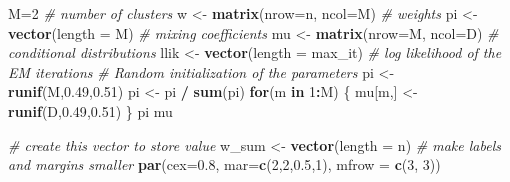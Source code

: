 \documentclass[
]{article}
\newenvironment{Shaded}{\begin{snugshade}}{\end{snugshade}}
\newcommand{\AttributeTok}[1]{\textcolor[rgb]{0.13,0.29,0.53}{#1}}
\newcommand{\CommentTok}[1]{\textcolor[rgb]{0.56,0.35,0.01}{\textit{#1}}}
\newcommand{\ControlFlowTok}[1]{\textcolor[rgb]{0.13,0.29,0.53}{\textbf{#1}}}
\newcommand{\DecValTok}[1]{\textcolor[rgb]{0.00,0.00,0.81}{#1}}
\newcommand{\FloatTok}[1]{\textcolor[rgb]{0.00,0.00,0.81}{#1}}
\newcommand{\FunctionTok}[1]{\textcolor[rgb]{0.13,0.29,0.53}{\textbf{#1}}}
\newcommand{\NormalTok}[1]{#1}
\newcommand{\OtherTok}[1]{\textcolor[rgb]{0.56,0.35,0.01}{#1}}
\newcommand{\SpecialCharTok}[1]{\textcolor[rgb]{0.81,0.36,0.00}{\textbf{#1}}}
\begin{document}
\begin{Shaded}
\begin{Highlighting}[]
\NormalTok{M}\OtherTok{=}\DecValTok{2} \CommentTok{\# number of clusters}
\NormalTok{w }\OtherTok{\textless{}{-}} \FunctionTok{matrix}\NormalTok{(}\AttributeTok{nrow=}\NormalTok{n, }\AttributeTok{ncol=}\NormalTok{M) }\CommentTok{\# weights}
\NormalTok{pi }\OtherTok{\textless{}{-}} \FunctionTok{vector}\NormalTok{(}\AttributeTok{length =}\NormalTok{ M) }\CommentTok{\# mixing coefficients}
\NormalTok{mu }\OtherTok{\textless{}{-}} \FunctionTok{matrix}\NormalTok{(}\AttributeTok{nrow=}\NormalTok{M, }\AttributeTok{ncol=}\NormalTok{D) }\CommentTok{\# conditional distributions}
\NormalTok{llik }\OtherTok{\textless{}{-}} \FunctionTok{vector}\NormalTok{(}\AttributeTok{length =}\NormalTok{ max\_it) }\CommentTok{\# log likelihood of the EM iterations}
\CommentTok{\# Random initialization of the parameters}
\NormalTok{pi }\OtherTok{\textless{}{-}} \FunctionTok{runif}\NormalTok{(M,}\FloatTok{0.49}\NormalTok{,}\FloatTok{0.51}\NormalTok{)}
\NormalTok{pi }\OtherTok{\textless{}{-}}\NormalTok{ pi }\SpecialCharTok{/} \FunctionTok{sum}\NormalTok{(pi)}
\ControlFlowTok{for}\NormalTok{(m }\ControlFlowTok{in} \DecValTok{1}\SpecialCharTok{:}\NormalTok{M) \{}
\NormalTok{  mu[m,] }\OtherTok{\textless{}{-}} \FunctionTok{runif}\NormalTok{(D,}\FloatTok{0.49}\NormalTok{,}\FloatTok{0.51}\NormalTok{)}
\NormalTok{\}}
\NormalTok{pi}
\NormalTok{mu}

\CommentTok{\# create this vector to store value}
\NormalTok{w\_sum }\OtherTok{\textless{}{-}} \FunctionTok{vector}\NormalTok{(}\AttributeTok{length =}\NormalTok{ n)}
\CommentTok{\# make labels and margins smaller}
\FunctionTok{par}\NormalTok{(}\AttributeTok{cex=}\FloatTok{0.8}\NormalTok{, }\AttributeTok{mar=}\FunctionTok{c}\NormalTok{(}\DecValTok{2}\NormalTok{,}\DecValTok{2}\NormalTok{,}\FloatTok{0.5}\NormalTok{,}\DecValTok{1}\NormalTok{), }\AttributeTok{mfrow =} \FunctionTok{c}\NormalTok{(}\DecValTok{3}\NormalTok{, }\DecValTok{3}\NormalTok{))}


\end{Highlighting}
\end{Shaded}
\end{document}
